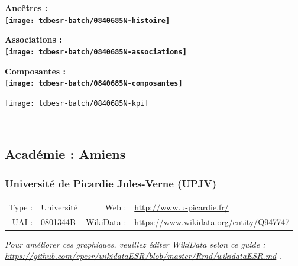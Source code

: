 \documentclass[12pt,french,]{article}
\begin{document}
\vspace{1cm}  
\begin{minipage}[b]{0.50\textwidth}\begin{center} \bf Ancêtres : \\  
\texttt{[image: tdbesr-batch/0840685N-histoire]} \end{center}\end{minipage}\begin{minipage}[b]{0.50\textwidth}\begin{center} \bf Associations : \\  
\texttt{[image: tdbesr-batch/0840685N-associations]} \end{center}\end{minipage}

\hrulefill

\begin{center} \bf Composantes : \\  
\texttt{[image: tdbesr-batch/0840685N-composantes]} \end{center}

\begin{center}\texttt{[image: tdbesr-batch/0840685N-kpi]} \end{center}\checkoddpage

\ifoddpage \fi ~\newpage  

\hypertarget{acaduxe9mie-amiens}{%
\subsection{Académie : Amiens}\label{acaduxe9mie-amiens}}

\hypertarget{universituxe9-de-picardie-jules-verne-upjv}{%
\subsubsection{Université de Picardie Jules-Verne
(UPJV)}\label{universituxe9-de-picardie-jules-verne-upjv}}

\begin{tabular*}{\textwidth}{rp{5cm}rl}  
\hline  
Type : & Université & Web : &\href{http://www.u-picardie.fr/}{http://www.u-picardie.fr/} \\  
UAI : & 0801344B & WikiData : & \href{https://www.wikidata.org/entity/Q947747}{https://www.wikidata.org/entity/Q947747} \\  
\hline  
\end{tabular*}

\textit{\scriptsize Pour améliorer ces graphiques, veuillez éditer WikiData selon ce guide :  \href{https://github.com/cpesr/wikidataESR/blob/master/Rmd/wikidataESR.md}{https://github.com/cpesr/wikidataESR/blob/master/Rmd/wikidataESR.md}}
.
\end{document}
